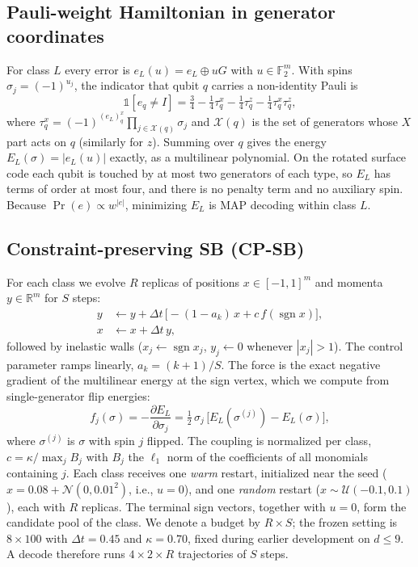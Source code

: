 \documentclass[journal]{IEEEtran}
\newcommand{\F}{\mathbb{F}_2}
\begin{document}
\subsection{Pauli-weight Hamiltonian in generator coordinates}
For class $L$ every error is $e_L(u)=e_L\oplus uG$ with $u\in\F^m$. With spins $\sigma_j=(-1)^{u_j}$, the indicator that qubit $q$ carries a non-identity Pauli is
\begin{equation}
\mathbb{1}[e_q\neq I]=\tfrac34-\tfrac14\tau^x_q-\tfrac14\tau^z_q-\tfrac14\tau^x_q\tau^z_q,
\end{equation}
where $\tau^x_q=(-1)^{(e_L)^x_q}\prod_{j\in\mathcal{X}(q)}\sigma_j$ and $\mathcal{X}(q)$ is the set of generators whose $X$ part acts on $q$ (similarly for $z$). Summing over $q$ gives the energy $E_L(\sigma)=|e_L(u)|$ exactly, as a multilinear polynomial. On the rotated surface code each qubit is touched by at most two generators of each type, so $E_L$ has terms of order at most four, and there is no penalty term and no auxiliary spin. Because $\Pr(e)\propto w^{|e|}$, minimizing $E_L$ is MAP decoding within class $L$.

\subsection{Constraint-preserving SB (CP-SB)}
\label{sec:cpsb}
For each class we evolve $R$ replicas of positions $x\in[-1,1]^m$ and momenta $y\in\mathbb{R}^m$ for $S$ steps:
\begin{align}
y &\leftarrow y + \Delta t\,\bigl[-(1-a_k)\,x + c\, f(\operatorname{sgn} x)\bigr],\\
x &\leftarrow x + \Delta t\, y,
\end{align}
followed by inelastic walls ($x_j\leftarrow\operatorname{sgn}x_j$, $y_j\leftarrow0$ whenever $|x_j|>1$). The control parameter ramps linearly, $a_k=(k+1)/S$. The force is the exact negative gradient of the multilinear energy at the sign vertex, which we compute from single-generator flip energies:
\begin{equation}
f_j(\sigma)=-\frac{\partial E_L}{\partial\sigma_j}=\tfrac12\,\sigma_j\,\bigl[E_L(\sigma^{(j)})-E_L(\sigma)\bigr],
\end{equation}
where $\sigma^{(j)}$ is $\sigma$ with spin $j$ flipped. The coupling is normalized per class, $c=\kappa/\max_j B_j$ with $B_j$ the $\ell_1$ norm of the coefficients of all monomials containing $j$. Each class receives one \emph{warm} restart, initialized near the seed ($x=0.08+\mathcal{N}(0,0.01^2)$, i.e., $u=0$), and one \emph{random} restart ($x\sim\mathcal{U}(-0.1,0.1)$), each with $R$ replicas. The terminal sign vectors, together with $u=0$, form the candidate pool of the class. We denote a budget by $R\times S$; the frozen setting is $8\times100$ with $\Delta t=0.45$ and $\kappa=0.70$, fixed during earlier development on $d\le 9$. A decode therefore runs $4\times2\times R$ trajectories of $S$ steps.
\end{document}
